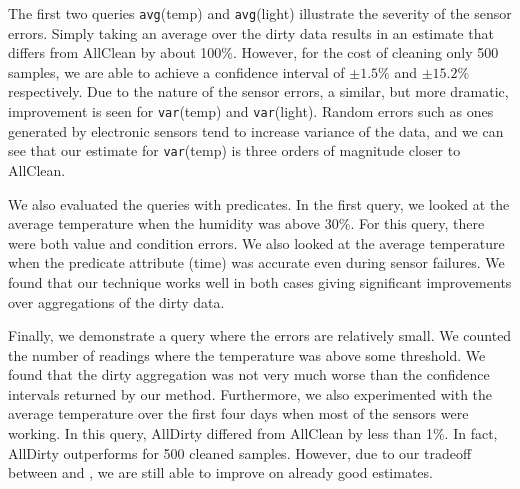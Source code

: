 The first two queries \texttt{avg}(temp) and \texttt{avg}(light) illustrate the severity of the sensor errors.
Simply taking an average over the dirty data results in an estimate that differs from AllClean by about 100\%.
However, for the cost of cleaning only 500 samples, we are able to achieve a confidence interval of $\pm 1.5\%$ and $\pm 15.2\%$ respectively.
Due to the nature of the sensor errors, a similar, but more dramatic, improvement is seen for \texttt{var}(temp) and \texttt{var}(light).
Random errors such as ones generated by electronic sensors tend to increase variance of the data, and we can see that our estimate for \texttt{var}(temp) is three orders of magnitude closer to AllClean.

We also evaluated the queries with predicates.
In the first query, we looked at the average temperature when the humidity was above 30\%.
For this query, there were both value and condition errors.
We also looked at the average temperature when the predicate attribute (time) was accurate even during sensor failures.
We found that our technique works well in both cases giving significant improvements over aggregations of the dirty data.

Finally, we demonstrate a query where the errors are relatively small.
We counted the number of readings where the temperature was above some threshold.
We found that the dirty aggregation was not very much worse than the confidence intervals returned by our method.
Furthermore, we also experimented with the average temperature over the first four days when most of the sensors were working.
In this query, AllDirty differed from AllClean by less than 1\%. 
In fact, AllDirty outperforms \sampleclean for 500 cleaned samples.
However, due to our tradeoff between \sampleclean and \bias, we are still able to improve on already good estimates.


